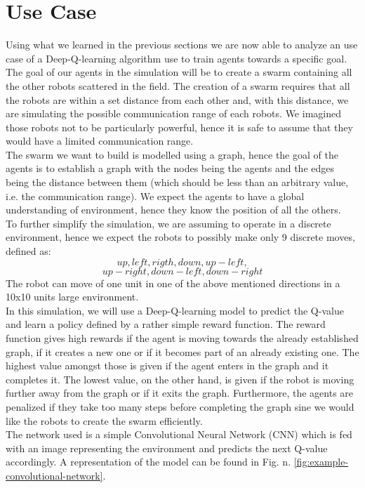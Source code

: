 \documentclass[conference]{IEEEtran}
\begin{document}
\section{Use Case}
Using what we learned in the previous sections we are now able to analyze an use case of a Deep-Q-learning algorithm use to train agents towards a specific goal. \\
The goal of our agents in the simulation will be to create a swarm containing all the other robots scattered in the field.
The creation of a swarm requires that all the robots are within a set distance from each other and, with this distance, we are simulating the possible communication range of each robots. We imagined those robots not to be particularly powerful, hence it is safe to assume that they would have a limited communication range.\\
The swarm we want to build is modelled using a graph, hence the goal of the agents is to establish a graph with the nodes being the agents and the edges being the distance between them (which should be less than an arbitrary value, i.e. the communication range). We expect the agents to have a global understanding of environment, hence they know the position of all the others.\\
To further simplify the simulation, we are assuming to operate in a discrete environment, hence  we expect the robots to possibly make only 9 discrete moves, defined as:
\[
    up,left, rigth,down, up-left,
\]
\[
    up-right, down-left, down-right
\]
The robot can move of one unit in one of the above mentioned directions in a 10x10 units large environment.\\
In this simulation, we will use a Deep-Q-learning model to predict the Q-value and learn a policy defined by a rather simple reward function. The reward function gives high rewards if the agent is moving towards the already established graph, if it creates a new one or if it becomes part of an already existing one. The highest value amongst those is given if the agent enters in the graph and it completes it. The lowest value, on the other hand, is given if the robot is moving further away from the graph or if it exits the graph. Furthermore, the agents are penalized if they take too many steps before completing the graph sine we would like the robots to create the swarm efficiently.\\ 
The network used is a simple Convolutional Neural Network (CNN) which is fed with an image representing the environment and predicts the next Q-value accordingly. A representation of the model can be found in Fig. n. \ref{fig:example-convolutional-network}. \\
\end{document}
